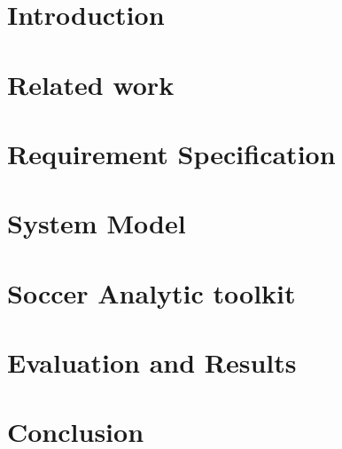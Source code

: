 \documentclass[12pt,twoside,a4paper,openright]{book}
\begin{document}
\listoffigures

\listoftables


\pagestyle{plain}
\cleardoublepage
{}
\chapter{Introduction} \label{Introduction}

\acresetall
\chapter{Related work} \label{Background}

\acresetall
\chapter{Requirement Specification} \label{Requirements}

\acresetall

\chapter{System Model} \label{Model}

\acresetall

\chapter{Soccer Analytic toolkit} \label{Design}

\acresetall

\chapter{Evaluation and Results} \label{Evaluation}
 
\acresetall

\chapter{Conclusion} \label{Conclusion}

\acresetall




\appendix
\end{document}
